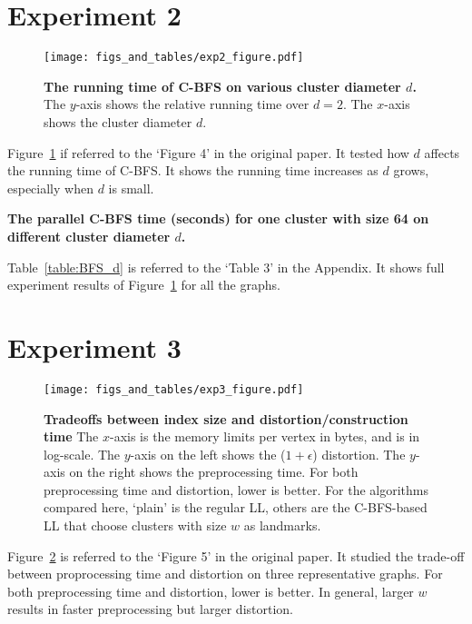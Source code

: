 \documentclass{article}
\begin{document}
\section{Experiment 2}
\begin{figure}[htbp]
  \centering
  \texttt{[image: figs\_and\_tables/exp2\_figure.pdf]}
  \caption{\small \textbf{The running time of C-BFS on various cluster diameter $d$.}
  The $y$-axis shows the relative running time over $d=2$. The $x$-axis shows the cluster diameter $d$. 
  }
  \label{fig:ccbfs_d}
\end{figure} 
Figure~\ref{fig:ccbfs_d} if referred to the `Figure 4' in the original paper. It tested how $d$ affects the running time of C-BFS.  It shows the running time increases as $d$ grows, especially when $d$ is small. 

\begin{table}[htbp]
  \centering
  \footnotesize
  
  \caption{
    \small\textbf{The parallel C-BFS time (seconds) for one cluster with size 64 on different cluster diameter $d$.} 
    \label{table:BFS_d}
  }
\end{table}
Table~\ref{table:BFS_d} is referred to the `Table 3' in the Appendix. It shows full experiment results of Figure~\ref{fig:ccbfs_d} for all the graphs.

\section{Experiment 3}
\begin{figure}
  \centering
  \texttt{[image: figs\_and\_tables/exp3\_figure.pdf]}    \caption{\small \textbf{Tradeoffs between index size and distortion/construction time}
  The $x$-axis is the memory limits per vertex in bytes, and is in log-scale. The $y$-axis on the left shows the ($1+\epsilon$) distortion.  The $y$-axis on the right shows the preprocessing time. For both preprocessing time and
  distortion, lower is better. For the algorithms compared here, `plain' is the regular LL, others are the C-BFS-based LL that choose clusters with size $w$ as landmarks.
  \label{fig:approx}
  }
\end{figure} 

Figure~\ref{fig:approx} is referred to the `Figure 5' in the original paper. It studied the trade-off between proprocessing time and distortion on three representative graphs. For both preprocessing time and distortion, lower is better.  In general, larger $w$ results in faster preprocessing but larger distortion. 
\end{document}
